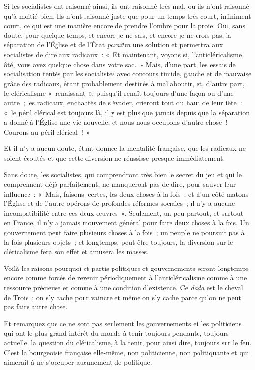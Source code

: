 \documentclass[french,twoside]{book} %
\begin{document}
Si les socialistes ont raisonné ainsi, ils ont raisonné très mal, ou ils n’ont raisonné qu’à moitié bien. Ils n’ont raisonné juste que pour un temps  très court, infiniment court, ce qui est une manière encore de prendre l’ombre pour la proie. Oui, sans doute, pour quelque temps, et encore je ne sais, et encore je ne crois pas, la séparation de l’Église et de l’État {\itshape paraîtra} une solution et permettra aux socialistes de dire aux radicaux : « Et maintenant, voyons si, l’anticléricalisme ôté, vous avez quelque chose dans votre sac. » Mais, d’une part, les essais de socialisation tentés par les socialistes avec concours timide, gauche et de mauvaise grâce des radicaux, étant probablement destinés à mal aboutir, et, d’autre part, le cléricalisme « renaissant », puisqu’il renaît toujours d’une façon ou d’une autre ; les radicaux, enchantés de s’évader, crieront tout du haut de leur tête : « le péril clérical est toujours là, il y est plus que jamais depuis que la séparation a donné à l’Église une vie nouvelle, et nous nous occupons d’autre chose ! Courons au péril clérical ! »\par
Et il n’y a aucun doute, étant donnée la mentalité française, que les radicaux ne soient écoutés et que cette diversion ne réussisse presque immédiatement.\par
Sans doute, les socialistes, qui comprendront très bien le secret du jeu et qui le comprennent déjà parfaitement, ne manqueront pas de dire, pour sauver leur influence : « Mais, faisons, certes, les  deux choses à la fois ; et d’un côté matons l’Église et de l’autre opérons de profondes réformes sociales ; il n’y a aucune incompatibilité entre ces deux œuvres ». Seulement, un peu partout, et surtout en France, il n’y a jamais mouvement général pour faire deux choses à la fois. Un gouvernement peut faire plusieurs choses à la fois ; un peuple ne poursuit pas à la fois plusieurs objets ; et longtemps, peut-être toujours, la diversion sur le cléricalisme fera son effet et amusera les masses.\par
Voilà les raisons pourquoi et partis politiques et gouvernements seront longtemps encore comme forcés de revenir périodiquement à l’anticléricalisme comme à une ressource précieuse et comme à une condition d’existence. Ce {\itshape dada} est le cheval de Troie ; on s’y cache pour vaincre et même on s’y cache parce qu’on ne peut pas faire autre chose.\par
Et remarquez que ce ne sont pas seulement les gouvernements et les politiciens qui ont le plus grand intérêt du monde à tenir toujours pendante, toujours actuelle, la question du cléricalisme, à la tenir, pour ainsi dire, toujours sur le feu. C’est la bourgeoisie française elle-même, non politicienne, non politiquante et qui aimerait à ne s’occuper aucunement de politique.\par
\end{document}
